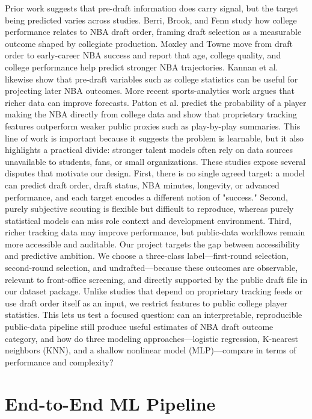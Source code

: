 Prior work suggests that pre-draft information does carry signal, but the target being predicted varies across studies. Berri, Brook, and Fenn \cite{berri2011nba} study how college performance relates to NBA draft order, framing draft selection as a measurable outcome shaped by collegiate production. Moxley and Towne \cite{moxley2015nba} move from draft order to early-career NBA success and report that age, college quality, and college performance help predict stronger NBA trajectories. Kannan et al. \cite{kannan2018nba} likewise show that pre-draft variables such as college statistics can be useful for projecting later NBA outcomes.
More recent sports-analytics work argues that richer data can improve forecasts. Patton et al. \cite{patton2021nba} predict the probability of a player making the NBA directly from college data and show that proprietary tracking features outperform weaker public proxies such as play-by-play summaries. This line of work is important because it suggests the problem is learnable, but it also highlights a practical divide: stronger talent models often rely on data sources unavailable to students, fans, or small organizations.
These studies expose several disputes that motivate our design. First, there is no single agreed target: a model can predict draft order, draft status, NBA minutes, longevity, or advanced performance, and each target encodes a different notion of "success." Second, purely subjective scouting is flexible but difficult to reproduce, whereas purely statistical models can miss role context and development environment. Third, richer tracking data may improve performance, but public-data workflows remain more accessible and auditable.
Our project targets the gap between accessibility and predictive ambition. We choose a three-class label---first-round selection, second-round selection, and undrafted---because these outcomes are observable, relevant to front-office screening, and directly supported by the public draft file in our dataset package. Unlike studies that depend on proprietary tracking feeds or use draft order itself as an input, we restrict features to public college player statistics. This lets us test a focused question: can an interpretable, reproducible public-data pipeline still produce useful estimates of NBA draft outcome category, and how do three modeling approaches---logistic regression, K-nearest neighbors (KNN), and a shallow nonlinear model (MLP)---compare in terms of performance and complexity?

\section{End-to-End ML Pipeline}


